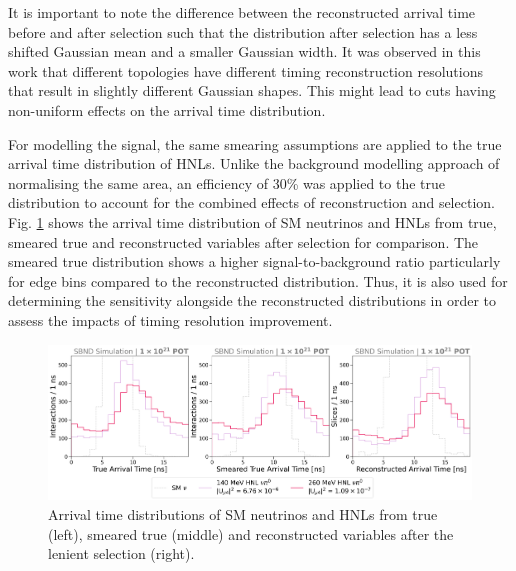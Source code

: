 It is important to note the difference between the reconstructed arrival time before and after selection such that the distribution after selection has a less shifted Gaussian mean and a smaller Gaussian width.
It was observed in this work that different topologies have different timing reconstruction resolutions that result in slightly different Gaussian shapes. 
This might lead to cuts having non-uniform effects on the arrival time distribution.

For modelling the signal, the same smearing assumptions are applied to the true arrival time distribution of HNLs. 
Unlike the background modelling approach of normalising the same area, an efficiency of 30\% was applied to the true distribution to account for the combined effects of reconstruction and selection.
Fig. \ref{fig:hnl_sm_smear} shows the arrival time distribution of SM neutrinos and HNLs from true, smeared true and reconstructed variables after selection for comparison. 
The smeared true distribution shows a higher signal-to-background ratio particularly for edge bins compared to the reconstructed distribution.
Thus, it is also used for determining the sensitivity alongside the reconstructed distributions in order to assess the impacts of timing resolution improvement.

\begin{figure}[ht!]
    \centering
    \includegraphics[width=\textwidth]{truth_smear_zoom.png}
    \caption[Arrival Time of SM Neutrinos and HNLs with an Improved Timing Resolution]{Arrival time distributions of SM neutrinos and HNLs from true (left), smeared true (middle) and reconstructed variables after the lenient selection (right).}
    \label{fig:hnl_sm_smear}
\end{figure}


